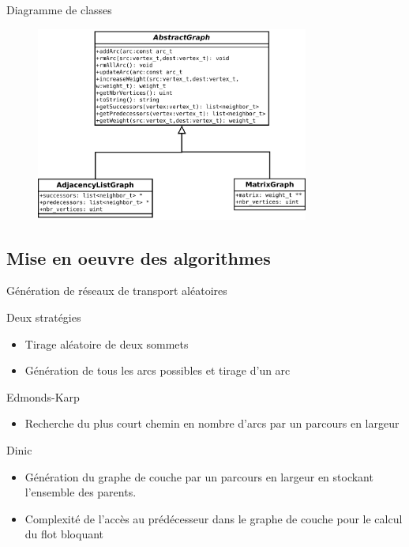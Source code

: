 \begin{frame}{Diagramme de classes}
\begin{figure}
\includegraphics[width=0.8\textwidth]{img/diag_class.pdf}
\end{figure}
\end{frame}


\subsection{Mise en oeuvre des algorithmes}
\begin{frame}{Génération de réseaux de transport aléatoires}
\begin{block}{Deux stratégies}
  \begin{itemize}
  	\item Tirage aléatoire de deux sommets
  	\item Génération de tous les arcs possibles et tirage d'un arc
  \end{itemize}
\end{block}
\end{frame}

\begin{frame}{Edmonds-Karp}
	 \begin{itemize}
  	\item Recherche du plus court chemin en nombre d'arcs par un parcours en largeur
  \end{itemize}
\end{frame}

\begin{frame}{Dinic}
	 \begin{itemize}
	 	\item Génération du graphe de couche par un parcours en largeur en stockant l'ensemble des parents.
  	\item Complexité de l'accès au prédécesseur dans le graphe de couche pour le calcul du flot bloquant
  \end{itemize}
\end{frame}